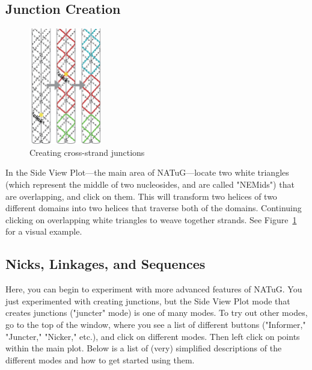 \documentclass[titlepage]{article}
\begin{document}
	\newpage
		
	\subsection{Junction Creation}
	\begin{figure}[h]
		\centering
		\includegraphics[height=2in]{creating-junctions.png}
		\caption{Creating cross-strand junctions}
		\label{fig:creating-junctions}
	\end{figure}
	
	In the Side View Plot---the main area of NATuG---locate two white triangles (which represent the middle of two nucleosides, and are called "NEMids") that are overlapping, and click on them. This will transform two helices of two different domains into two helices that traverse both of the domains. Continuing clicking on overlapping white triangles to weave together strands. See Figure~\ref{fig:creating-junctions} for a visual example.
	
	\subsection{Nicks, Linkages, and Sequences}
	Here, you can begin to experiment with more advanced features of NATuG. You just experimented with creating junctions, but the Side View Plot mode that creates junctions ("juncter" mode) is one of many modes. To try out other modes, go to the top of the window, where you see a list of different buttons ("Informer," "Juncter," "Nicker," etc.), and click on different modes. Then left click on points within the main plot. Below is a list of (very) simplified descriptions of the different modes and how to get started using them.
	
\end{document}
